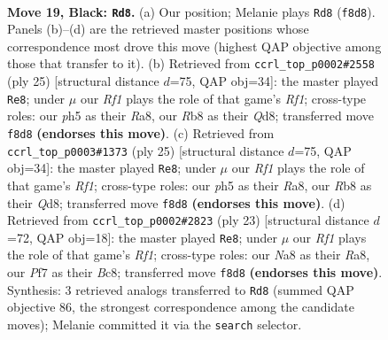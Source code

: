 \documentclass[11pt]{article}
\begin{document}
\clearpage

\begin{figure}[p]\centering
\begin{subfigure}{0.46\textwidth}\centering
\resizebox{\linewidth}{!}{%
\newchessgame
\chessboard[
  setfen={nrb2rk1/p3qpbp/8/1pp1pn1P/4B3/3PP3/PP3P2/RNBQNRK1 b - - 5 19},
  showmover=false,
  pgfstyle=straightmove, color=movearrow, markmove={f8-d8}
]}
\caption{}
\end{subfigure}\hfill
\begin{subfigure}{0.46\textwidth}\centering
\resizebox{\linewidth}{!}{%
\newchessgame
\chessboard[
  setfen={r2q1rk1/1bp2ppp/p4b2/1p1n4/3P4/1BP5/PP3PPP/RNBQR1K1 b - - 2 13},
  showmover=false,
  pgfstyle=straightmove, color=movearrow, markmove={f8-e8}
]}
\caption{}
\end{subfigure}
\\[4pt]
\begin{subfigure}{0.46\textwidth}\centering
\resizebox{\linewidth}{!}{%
\newchessgame
\chessboard[
  setfen={r2q1rk1/1bp2ppp/p4b2/1p1n4/3P4/1BP5/PP3PPP/RNBQR1K1 b - - 2 13},
  showmover=false,
  pgfstyle=straightmove, color=movearrow, markmove={f8-e8}
]}
\caption{}
\end{subfigure}\hfill
\begin{subfigure}{0.46\textwidth}\centering
\resizebox{\linewidth}{!}{%
\newchessgame
\chessboard[
  setfen={r1bq1rk1/pp3ppp/2pb1n2/2n5/3NP3/6P1/PPQ2PBP/RNBR2K1 b - - 2 12},
  showmover=false,
  pgfstyle=straightmove, color=movearrow, markmove={f8-e8}
]}
\caption{}
\end{subfigure}
\caption{\textbf{Move 19, Black: \texttt{Rd8}.} (a) Our position; Melanie plays \texttt{Rd8} (\texttt{f8d8}). Panels (b)--(d) are the retrieved master positions whose correspondence most drove this move (highest QAP objective among those that transfer to it). (b) Retrieved from \texttt{ccrl\_top\_p0002\#2558} (ply 25) [structural distance $d$=75, QAP obj=34]: the master played \texttt{Re8}; under $\mu$ our \emph{Rf1} plays the role of that game's \emph{Rf1}; cross-type roles: our \emph{p}h5 as their \emph{R}a8, our \emph{R}b8 as their \emph{Q}d8; transferred move \texttt{f8d8} \textbf{(endorses this move)}. (c) Retrieved from \texttt{ccrl\_top\_p0003\#1373} (ply 25) [structural distance $d$=75, QAP obj=34]: the master played \texttt{Re8}; under $\mu$ our \emph{Rf1} plays the role of that game's \emph{Rf1}; cross-type roles: our \emph{p}h5 as their \emph{R}a8, our \emph{R}b8 as their \emph{Q}d8; transferred move \texttt{f8d8} \textbf{(endorses this move)}. (d) Retrieved from \texttt{ccrl\_top\_p0002\#2823} (ply 23) [structural distance $d$=72, QAP obj=18]: the master played \texttt{Re8}; under $\mu$ our \emph{Rf1} plays the role of that game's \emph{Rf1}; cross-type roles: our \emph{N}a8 as their \emph{R}a8, our \emph{P}f7 as their \emph{B}c8; transferred move \texttt{f8d8} \textbf{(endorses this move)}. Synthesis: 3 retrieved analogs transferred to \texttt{Rd8} (summed QAP objective 86, the strongest correspondence among the candidate moves); Melanie committed it via the \texttt{search} selector.}
\label{fig:thought-m37}
\end{figure}
\end{document}
